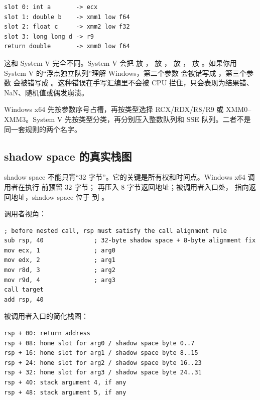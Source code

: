\begin{lstlisting}[numbers=none,caption={Windows x64 参数槽位推导}]
slot 0: int a       -> ecx
slot 1: double b    -> xmm1 low f64
slot 2: float c     -> xmm2 low f32
slot 3: long long d -> r9
return double       -> xmm0 low f64
\end{lstlisting}

这和 System V 完全不同。System V 会把  放 ， 放 ， 放 ， 放 。如果你用 System V 的“浮点独立队列”理解 Windows，第二个参数  会被错写成 ，第三个参数  会被错写成 。这种错误在手写汇编里不会被 CPU 拦住，只会表现为结果错、NaN、随机值或偶发崩溃。

\begin{keyidea}
Windows x64 先按参数序号占槽，再按类型选择 RCX/RDX/R8/R9 或 XMM0--XMM3。System V 先按类型分类，再分别压入整数队列和 SSE 队列。二者不是同一套规则的两个名字。
\end{keyidea}

\subsection{shadow space 的真实栈图}

shadow space 不能只背“32 字节”。它的关键是所有权和时间点。Windows x64 调用者在执行  前预留 32 字节； 再压入 8 字节返回地址；被调用者入口处， 指向返回地址，shadow space 位于 \code{[rsp+8]} 到 \code{[rsp+39]}。

调用者视角：

\begin{lstlisting}[numbers=none,caption={Windows x64 调用者准备一次调用}]
; before nested call, rsp must satisfy the call alignment rule
sub rsp, 40              ; 32-byte shadow space + 8-byte alignment fix
mov ecx, 1               ; arg0
mov edx, 2               ; arg1
mov r8d, 3               ; arg2
mov r9d, 4               ; arg3
call target
add rsp, 40
\end{lstlisting}

被调用者入口的简化栈图：

\begin{lstlisting}[numbers=none,caption={Windows x64 callee entry stack map}]
rsp + 00: return address
rsp + 08: home slot for arg0 / shadow space byte 0..7
rsp + 16: home slot for arg1 / shadow space byte 8..15
rsp + 24: home slot for arg2 / shadow space byte 16..23
rsp + 32: home slot for arg3 / shadow space byte 24..31
rsp + 40: stack argument 4, if any
rsp + 48: stack argument 5, if any
\end{lstlisting}

